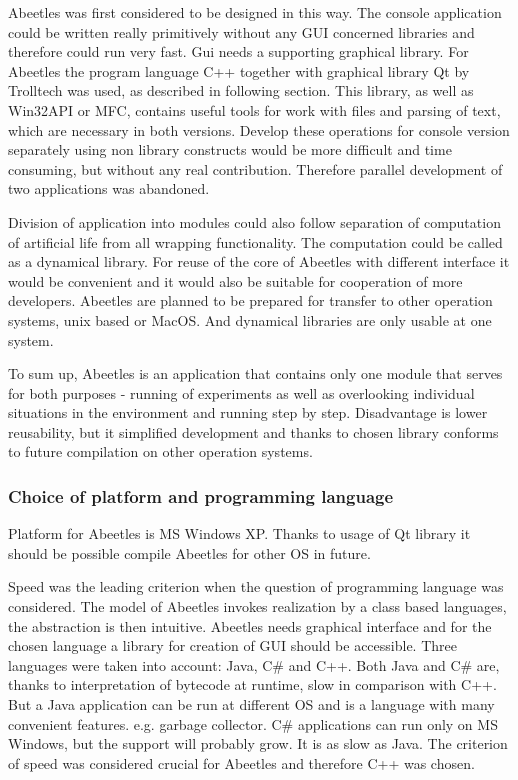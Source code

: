 \documentclass[a4paper,12pt]{report}
\begin{document}
Abeetles was first considered to be designed in this way. The console application could be written really primitively without any GUI concerned libraries and therefore could run very fast. Gui needs a supporting graphical library. For Abeetles the program language C++ together with graphical library Qt by Trolltech was used, as described in following section. This library, as well as Win32API or MFC, contains useful tools for work with files and parsing of text, which are necessary in both versions. Develop these operations for console version separately using non library constructs would be more difficult and time consuming, but without any real contribution. Therefore parallel development of two applications was abandoned. 

Division of application into modules could also follow separation of computation of artificial life from all wrapping functionality. The computation could be called as a dynamical library. For reuse of the core of Abeetles with different interface it would be convenient and it would also be suitable for cooperation of more developers. Abeetles are planned to be prepared for transfer to other operation systems, unix based or MacOS. And dynamical libraries are only usable at one system.

To sum up, Abeetles is an application that contains only one module that serves for both purposes - running of experiments as well as overlooking individual situations in the environment and running step by step. Disadvantage is lower reusability, but it simplified development and thanks to chosen library conforms to future compilation on other operation systems.

\subsubsection{Choice of platform and programming language}

Platform for Abeetles is MS Windows XP. Thanks to usage of Qt library it should be possible compile Abeetles for other OS in future.

Speed was the leading criterion when the question of programming language was considered. The model of Abeetles invokes realization by a class based languages, the abstraction is then intuitive. Abeetles needs graphical interface and for the chosen language a library for creation of GUI should be accessible. Three languages were taken into account: Java, C\# and C++. Both Java and C\# are, thanks to interpretation of bytecode at runtime, slow in comparison with C++. But a Java application can be run at different OS and is a language with many convenient features. e.g. garbage collector. C\# applications can run only on MS Windows, but the support will probably grow. It is as slow as Java. The criterion of speed was considered crucial for Abeetles and therefore C++ was chosen.
\end{document}
